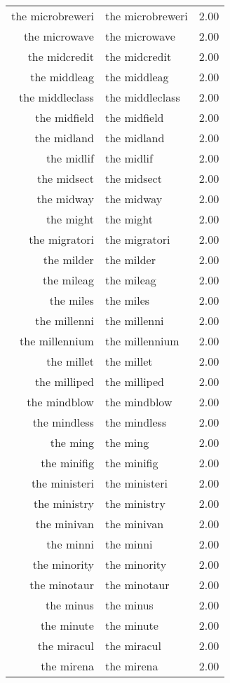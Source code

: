 \begin{table}[ht]
\begin{tabular}{rlr}
  the microbreweri & the microbreweri & 2.00 \\ 
  the microwave & the microwave & 2.00 \\ 
  the midcredit & the midcredit & 2.00 \\ 
  the middleag & the middleag & 2.00 \\ 
  the middleclass & the middleclass & 2.00 \\ 
  the midfield & the midfield & 2.00 \\ 
  the midland & the midland & 2.00 \\ 
  the midlif & the midlif & 2.00 \\ 
  the midsect & the midsect & 2.00 \\ 
  the midway & the midway & 2.00 \\ 
  the might & the might & 2.00 \\ 
  the migratori & the migratori & 2.00 \\ 
  the milder & the milder & 2.00 \\ 
  the mileag & the mileag & 2.00 \\ 
  the miles & the miles & 2.00 \\ 
  the millenni & the millenni & 2.00 \\ 
  the millennium & the millennium & 2.00 \\ 
  the millet & the millet & 2.00 \\ 
  the milliped & the milliped & 2.00 \\ 
  the mindblow & the mindblow & 2.00 \\ 
  the mindless & the mindless & 2.00 \\ 
  the ming & the ming & 2.00 \\ 
  the minifig & the minifig & 2.00 \\ 
  the ministeri & the ministeri & 2.00 \\ 
  the ministry & the ministry & 2.00 \\ 
  the minivan & the minivan & 2.00 \\ 
  the minni & the minni & 2.00 \\ 
  the minority & the minority & 2.00 \\ 
  the minotaur & the minotaur & 2.00 \\ 
  the minus & the minus & 2.00 \\ 
  the minute & the minute & 2.00 \\ 
  the miracul & the miracul & 2.00 \\ 
  the mirena & the mirena & 2.00 \\ 

\end{tabular}
\end{table}
